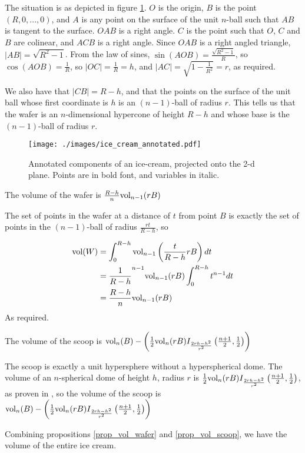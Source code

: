 The situation is as depicted in figure \ref{fig_ice_cream_annotated}. $O$ is the origin, $B$ is the point $(R,0,...,0)$, and $A$ is any point on the surface of the unit $n$-ball such that $AB$ is tangent to the surface. $OAB$ is a right angle. $C$ is the point such that $O$, $C$ and $B$ are colinear, and $ACB$ is a right angle. Since $OAB$ is a right angled triangle, $|AB| = \sqrt{R^2-1}$. From the law of sines, $\sin(AOB) = \frac{\sqrt{R^2-1}}{R}$, so $\cos(AOB) = \frac{1}{R}$, so $|OC| = \frac{1}{R} = h$, and $|AC| = \sqrt{1-\frac{1}{R^2}} = r$, as required.

We also have that $|CB| = R-h$, and that the points on the surface of the unit ball whose first coordinate is $h$ is an $(n-1)$-ball of radius $r$. This tells us that the wafer is an $n$-dimensional hypercone of height $R-h$ and whose base is the $(n-1)$-ball of radius $r$.

\begin{figure}
\centering
\texttt{[image: ./images/ice\_cream\_annotated.pdf]}
\caption{Annotated components of an ice-cream, projected onto the 2-d plane. Points are in bold font, and variables in italic.}
\label{fig_ice_cream_annotated}
\end{figure}

\begin{proposition} \label{prop_vol_wafer}
The volume of the wafer is $\frac{R-h}{n} \mbox{vol}_{n-1}(rB)$
\end{proposition}

The set of points in the wafer at a distance of $t$ from point $B$ is exactly the set of points in the $(n-1)$-ball of radius $\frac{rt}{R-h}$, so

\begin{align*}
\mbox{vol}(W)
&= \int^{R-h}_{0} \mbox{vol}_{n-1}\left(\frac{t}{R-h}rB\right) dt \\
&= \frac{1}{R-h}^{n-1} \mbox{vol}_{n-1}(rB) \int^{R-h}_0 t^{n-1}dt \\
&= \frac{R-h}{n} \mbox{vol}_{n-1}(rB)
\end{align*}
As required.

\begin{proposition} \label{prop_vol_scoop}
The volume of the scoop is $\mbox{vol}_n(B) - \left(\frac{1}{2}\mbox{vol}_n(rB) I_{\frac{2rh-h^2}{r^2}}\left(\frac{n+1}{2}, \frac{1}{2}\right)\right)$
\end{proposition}

The scoop is exactly a unit hypersphere without a hyperspherical dome. The volume of an $n$-spherical dome of height $h$, radius $r$ is $\frac{1}{2}\mbox{vol}_n(rB) I_{\frac{2rh-h^2}{r^2}}\left(\frac{n+1}{2}, \frac{1}{2}\right)$, as proven in \cite{Li11}, so the volume of the scoop is $\mbox{vol}_n(B) - \left(\frac{1}{2}\mbox{vol}_n(rB) I_{\frac{2rh-h^2}{r^2}}\left(\frac{n+1}{2}, \frac{1}{2}\right)\right)$

Combining propositions \ref{prop_vol_wafer} and \ref{prop_vol_scoop}, we have the volume of the entire ice cream.